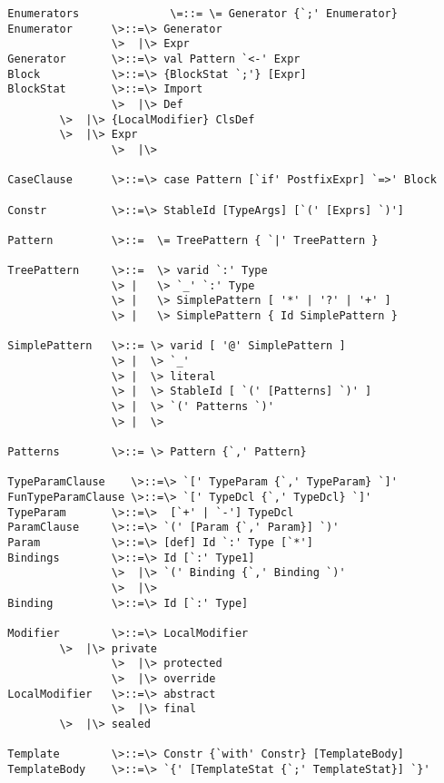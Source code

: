 \documentclass[11pt]{report}
\begin{document}
\begin{verbatim}
  Enumerators              \=::= \= Generator {`;' Enumerator}
  Enumerator      \>::=\> Generator
                  \>  |\> Expr
  Generator       \>::=\> val Pattern `<-' Expr
  Block           \>::=\> {BlockStat `;'} [Expr]
  BlockStat       \>::=\> Import
                  \>  |\> Def
		  \>  |\> {LocalModifier} ClsDef
		  \>  |\> Expr
                  \>  |\>

  CaseClause      \>::=\> case Pattern [`if' PostfixExpr] `=>' Block 

  Constr          \>::=\> StableId [TypeArgs] [`(' [Exprs] `)']  

  Pattern         \>::=  \= TreePattern { `|' TreePattern }

  TreePattern     \>::=  \> varid `:' Type
                  \> |   \> `_' `:' Type
                  \> |   \> SimplePattern [ '*' | '?' | '+' ]
                  \> |   \> SimplePattern { Id SimplePattern }

  SimplePattern   \>::= \> varid [ '@' SimplePattern ]
                  \> |  \> `_'
                  \> |  \> literal
                  \> |  \> StableId [ `(' [Patterns] `)' ]
                  \> |  \> `(' Patterns `)'
                  \> |  \> 

  Patterns        \>::= \> Pattern {`,' Pattern}

  TypeParamClause    \>::=\> `[' TypeParam {`,' TypeParam} `]'
  FunTypeParamClause \>::=\> `[' TypeDcl {`,' TypeDcl} `]'
  TypeParam       \>::=\>  [`+' | `-'] TypeDcl
  ParamClause     \>::=\> `(' [Param {`,' Param}] `)'
  Param           \>::=\> [def] Id `:' Type [`*']
  Bindings        \>::=\> Id [`:' Type1]
                  \>  |\> `(' Binding {`,' Binding `)'
                  \>  |\>
  Binding         \>::=\> Id [`:' Type]

  Modifier        \>::=\> LocalModifier
		  \>  |\> private
                  \>  |\> protected
                  \>  |\> override 
  LocalModifier   \>::=\> abstract
                  \>  |\> final
		  \>  |\> sealed

  Template        \>::=\> Constr {`with' Constr} [TemplateBody]
  TemplateBody    \>::=\> `{' [TemplateStat {`;' TemplateStat}] `}'
\end{verbatim}
\end{document}
